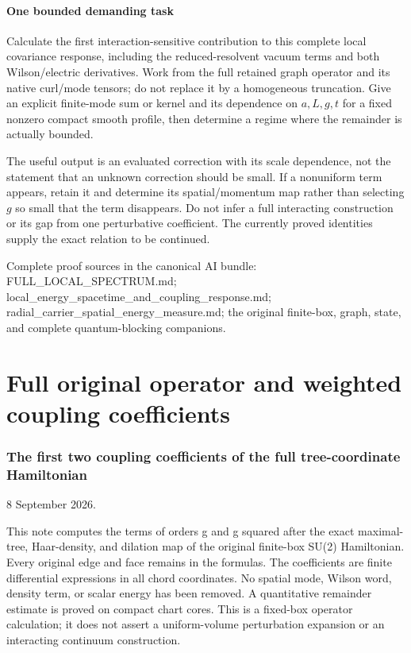 \documentclass[
  11pt,
]{article}
\begin{document}
\subsection{One bounded demanding
task}\label{weak-coupling-part-13-one-bounded-demanding-task}

Calculate the first interaction-sensitive contribution to this complete
local covariance response, including the reduced-resolvent vacuum terms
and both Wilson/electric derivatives. Work from the full retained graph
operator and its native curl/mode tensors; do not replace it by a
homogeneous truncation. Give an explicit finite-mode sum or kernel and
its dependence on \(a,L,g,t\) for a fixed nonzero compact smooth
profile, then determine a regime where the remainder is actually
bounded.

The useful output is an evaluated correction with its scale dependence,
not the statement that an unknown correction should be small. If a
nonuniform term appears, retain it and determine its spatial/momentum
map rather than selecting \(g\) so small that the term disappears. Do
not infer a full interacting construction or its gap from one
perturbative coefficient. The currently proved identities supply the
exact relation to be continued.

Complete proof sources in the canonical AI bundle:
FULL\_LOCAL\_SPECTRUM.md;
local\_energy\_spacetime\_and\_coupling\_response.md;
radial\_carrier\_spatial\_energy\_measure.md; the original finite-box,
graph, state, and complete quantum-blocking companions.

\clearpage
\part{Full original operator and weighted coupling coefficients}
\section{The first two coupling coefficients of the full tree-coordinate
Hamiltonian}\label{weak-coupling-part-14-the-first-two-coupling-coefficients-of-the-full-tree-coordinate-hamiltonian}

8 September 2026.

This note computes the terms of orders g and g squared after the exact
maximal-tree, Haar-density, and dilation map of the original finite-box
SU(2) Hamiltonian. Every original edge and face remains in the formulas.
The coefficients are finite differential expressions in all chord
coordinates. No spatial mode, Wilson word, density term, or scalar
energy has been removed. A quantitative remainder estimate is proved on
compact chart cores. This is a fixed-box operator calculation; it does
not assert a uniform-volume perturbation expansion or an interacting
continuum construction.
\end{document}
